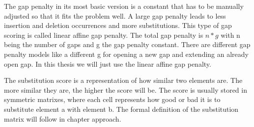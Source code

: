 The gap penalty in its most basic version is a constant that has to be manually adjusted so that it fits the problem well.
A large gap penalty leads to less insertion and deletion occurrences and more substitutions.
This type of gap scoring is called linear affine gap penalty.
The total gap penalty is $n*g$ with n being the number of gaps and g the gap penalty constant.
There are different gap penalty models like a different g for opening a new gap and extending an already open gap.
In this thesis we will just use the linear affine gap penalty.

The substitution score is a representation of how similar two elements are. The more similar they are, the higher the score will be.
The score is usually stored in symmetric matrixes, where each cell represents how good or bad it is to substitute element a with element b.
The formal definition of the substitution matrix will follow in chapter approach.
